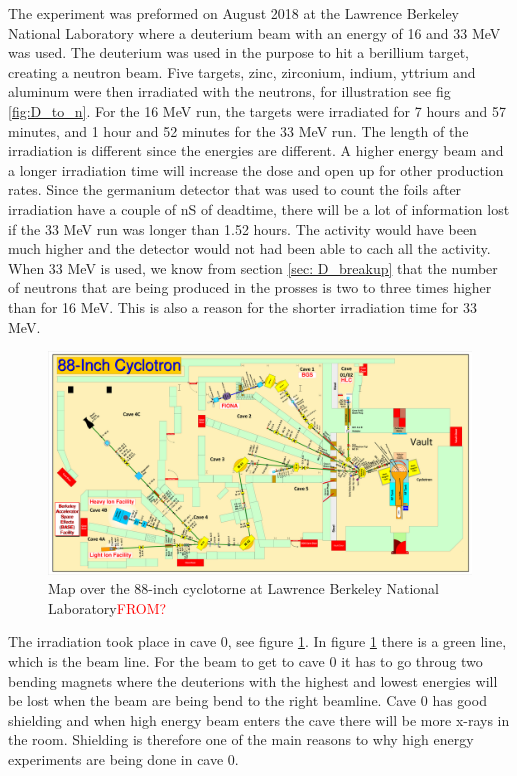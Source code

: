 \documentclass[twoside,english]{uiofysmaster/uiofysmaster}
\begin{document}
The experiment was preformed on August 2018 at the Lawrence Berkeley National Laboratory where a deuterium beam with an energy of 16 and 33 MeV was used. The deuterium was used in the purpose to hit a berillium target, creating a neutron beam. Five targets, zinc, zirconium, indium, yttrium and aluminum were then irradiated with the neutrons, for illustration see fig \ref{fig:D_to_n}. For the 16 MeV run, the targets were irradiated for 7 hours and 57 minutes, and 1 hour and 52 minutes for the 33 MeV run. The length of the irradiation is different since the energies are different. A higher energy beam and a longer irradiation time will increase the dose and open up for other production rates. Since the germanium detector that was used to count the foils after irradiation have a couple of nS of deadtime, there will be a lot of information lost if the 33 MeV run was longer than 1.52 hours. The activity would have been much higher and the detector would not had been able to cach all the activity. When 33 MeV is used, we know from section \ref{sec: D_breakup} that the number of neutrons that are being produced in the prosses is two to three times higher than for 16 MeV. This is also a reason for the shorter irradiation time for 33 MeV.

\begin{figure} [H]
   \centering
   \includegraphics[height=.6\textheight, angle=90]{Control-Room-Map.pdf}
   \caption{Map over the 88-inch cyclotorne at Lawrence Berkeley National Laboratory\textcolor{red}{FROM?}}
   \label{fig:Control-Room-Map}
\end{figure}
\noindent
The irradiation took place in cave 0, see figure \ref{fig:Control-Room-Map}. In figure \ref{fig:Control-Room-Map} there is a green line, which is the beam line. For the beam to get to cave 0 it has to go throug two bending magnets where the deuterions with the highest and lowest energies will be lost when the beam are being bend to the right beamline. Cave 0 has good shielding and when high energy beam enters the cave there will be more x-rays in the room. Shielding is therefore one of the main reasons to why high energy experiments are being done in cave 0.
\end{document}
